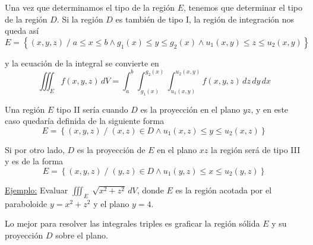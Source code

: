 \documentclass[12pt]{article}
\begin{document}
Una vez que determinamos el tipo de la región $ E $, tenemos que determinar el tipo de la región $ D $. Si la región $ D $ es también de tipo I, la región de integración nos queda así
\[
  E=\left\{(x,y,z) \;/\; a\leq x\leq b \land g_{1}(x)\leq y\leq g_{2}(x) \land u_{1}(x,y)\leq z\leq u_{2}(x,y)\right\}
\]

y la ecuación de la integral se convierte en 
\[
  \iiint_{E} f(x,y,z) \,dV=\int_{a}^{b} \int_{g_{1}(x)}^{g_{2}(x)} \int_{u_{1}(x,y)}^{u_{2}(x,y)} f(x,y,z) \,dz\,dy\,dx
\]

Una región $ E $ tipo II sería cuando $ D $ es la proyección en el plano $ yz $, y en este caso quedaría definida de la siguiente forma
\[
	E=\left\{(x,y,z) \;/\; (x,z) \in D \land u_{1}(x,z)\leq y\leq u_{2}(x,z)\right\}
\]

Si por otro lado, $ D $ es la proyección de $ E $ en el plano $ xz $ la región será de tipo III y es de la forma
\[
  E=\left\{(x,y,z) \;/\; (y,z) \in D \land u_{1}(y,z)\leq x\leq u_{2}(y,z)\right\}
\]

\underline{Ejemplo:} Evaluar $ \iiint_{E} \sqrt[]{x^2+z^2} \,dV $, donde $ E $ es la región acotada por el paraboloide $ y=x^2+z^2 $ y el plano $ y=4 $.

Lo mejor para resolver las integrales triples es graficar la región sólida $ E $ y su proyección $ D $ sobre el plano.
\end{document}
